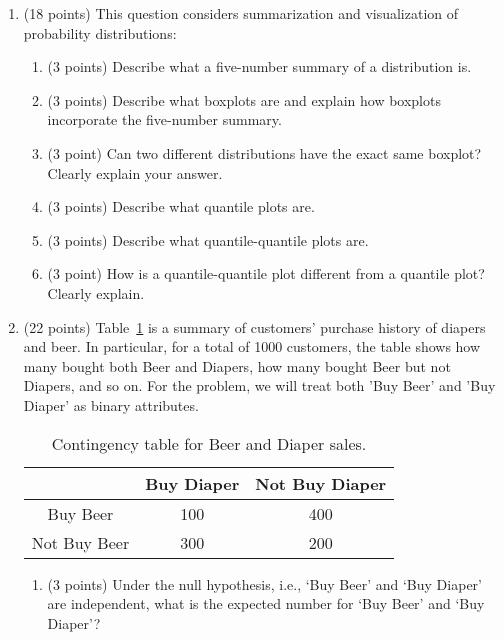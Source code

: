 \documentclass[11pt]{article}
\begin{document}
\newpage

\begin{enumerate}

\item (18 points) This question considers summarization and visualization of probability distributions:

\begin{enumerate}
\item (3 points) Describe what a five-number summary of a distribution is. 

\item (3 points) Describe what boxplots are and explain how boxplots incorporate the five-number summary.

\item (3 point) Can two different distributions have the exact same boxplot? Clearly explain your answer. 

\item (3 points) Describe what quantile plots are.

\item (3 points) Describe what quantile-quantile plots are. 

\item (3 point) How is a quantile-quantile plot different from a quantile plot? Clearly explain.
\end{enumerate}

\item (22 points) Table~\ref{tab:beerdiaper} is a summary of customers’ purchase history of diapers and beer. In particular, for a total of 1000 customers, the table shows how many bought both Beer and Diapers, how many bought Beer but not Diapers, and so on. For the problem, we will treat both 'Buy Beer' and 'Buy Diaper' as binary attributes.
\begin{table}[h]
    \centering
    \begin{tabular}{|c||c|c|} \hline
             & Buy Diaper & Not Buy Diaper \\ \hline \hline 
    Buy Beer  &  100 & 400 \\ 
    Not Buy Beer & 300 & 200 \\ \hline 
    \end{tabular}
    \caption{Contingency table for Beer and Diaper sales.}
    \label{tab:beerdiaper}
\end{table}
\begin{enumerate}
\item (3 points) Under the null hypothesis, i.e., `Buy Beer' and `Buy Diaper' are independent, 
what is the expected number for `Buy Beer' and `Buy Diaper'?


\end{enumerate}
\end{enumerate}
\end{document}
